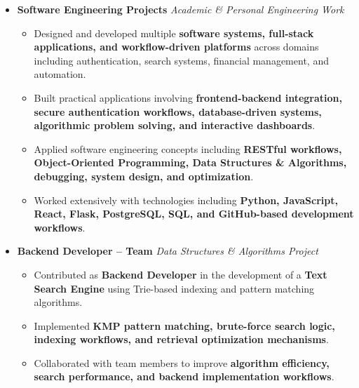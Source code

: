 \documentclass[a4paper,11pt]{article}
\newcommand{\resumeItem}[1]{
\item \small{#1 \vspace{-2pt}}
}
\begin{document}
\begin{itemize}[leftmargin=0in, label={}]

\item
\textbf{Software Engineering Projects}
\hfill \textit{Academic \& Personal Engineering Work}

\begin{itemize}[leftmargin=*]

\resumeItem{Designed and developed multiple \textbf{software systems, full-stack applications, and workflow-driven platforms} across domains including authentication, search systems, financial management, and automation.}

\resumeItem{Built practical applications involving \textbf{frontend-backend integration, secure authentication workflows, database-driven systems, algorithmic problem solving, and interactive dashboards}.}

\resumeItem{Applied software engineering concepts including \textbf{RESTful workflows, Object-Oriented Programming, Data Structures \& Algorithms, debugging, system design, and optimization}.}

\resumeItem{Worked extensively with technologies including \textbf{Python, JavaScript, React, Flask, PostgreSQL, SQL, and GitHub-based development workflows}.}

\end{itemize}

\vspace{4pt}

\item
\textbf{Backend Developer -- Team}
\hfill \textit{Data Structures \& Algorithms Project}

\begin{itemize}[leftmargin=*]

\resumeItem{Contributed as \textbf{Backend Developer} in the development of a \textbf{Text Search Engine} using Trie-based indexing and pattern matching algorithms.}

\resumeItem{Implemented \textbf{KMP pattern matching, brute-force search logic, indexing workflows, and retrieval optimization mechanisms}.}

\resumeItem{Collaborated with team members to improve \textbf{algorithm efficiency, search performance, and backend implementation workflows}.}

\end{itemize}

\end{itemize}

\vspace{-10pt}
\end{document}
